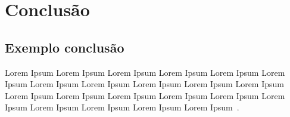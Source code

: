 \chapter{Conclusão}\label{conclusao}

\section{Exemplo conclusão}

Lorem Ipsum Lorem Ipsum Lorem Ipsum Lorem Ipsum Lorem Ipsum Lorem Ipsum Lorem Ipsum Lorem Ipsum Lorem Ipsum Lorem Ipsum Lorem Ipsum Lorem Ipsum Lorem Ipsum Lorem Ipsum Lorem Ipsum Lorem Ipsum Lorem Ipsum Lorem Ipsum Lorem Ipsum Lorem Ipsum Lorem Ipsum~\cite{r2021r}.
